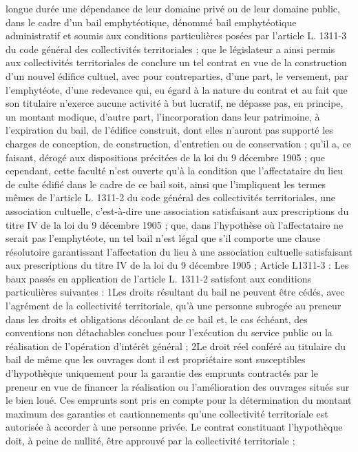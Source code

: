 \documentclass[11pt,a4paper]{report}
\begin{document}
longue durée une dépendance de leur domaine privé ou de leur domaine public, dans le cadre d'un bail
emphytéotique, dénommé bail emphytéotique administratif et soumis aux conditions particulières posées par
l'article L. 1311-3 du code général des collectivités territoriales ; que le législateur a ainsi permis aux
collectivités territoriales de conclure un tel contrat en vue de la construction d'un nouvel édifice cultuel, avec
pour contreparties, d'une part, le versement, par l'emphytéote, d'une redevance qui, eu égard à la nature du
contrat et au fait que son titulaire n'exerce aucune activité à but lucratif, ne dépasse pas, en principe, un
montant modique, d'autre part, l'incorporation dans leur patrimoine, à l'expiration du bail, de l'édifice construit,
dont elles n'auront pas supporté les charges de conception, de construction, d'entretien ou de conservation ;
qu'il a, ce faisant, dérogé aux dispositions précitées de la loi du 9 décembre 1905 ; que cependant, cette faculté
n'est ouverte qu'à la condition que l'affectataire du lieu de culte édifié dans le cadre de ce bail soit, ainsi que
l'impliquent les termes mêmes de l'article L. 1311-2 du code général des collectivités territoriales, une
association cultuelle, c'est-à-dire une association satisfaisant aux prescriptions du titre IV de la loi du 9
décembre 1905 ; que, dans l'hypothèse où l'affectataire ne serait pas l'emphytéote, un tel bail n'est légal que s'il
comporte une clause résolutoire garantissant l'affectation du lieu à une association cultuelle satisfaisant aux
prescriptions du titre IV de la loi du 9 décembre 1905 ;
Article L1311-3 : Les baux passés en application de l'article L. 1311-2 satisfont aux conditions particulières
suivantes :
1\degre  Les droits résultant du bail ne peuvent être cédés, avec l'agrément de la collectivité territoriale, qu'à une
personne subrogée au preneur dans les droits et obligations découlant de ce bail et, le cas échéant, des
conventions non détachables conclues pour l'exécution du service public ou la réalisation de l'opération d'intérêt
général ;
2\degre  Le droit réel conféré au titulaire du bail de même que les ouvrages dont il est propriétaire sont susceptibles
d'hypothèque uniquement pour la garantie des emprunts contractés par le preneur en vue de financer la
réalisation ou l'amélioration des ouvrages situés sur le bien loué.
Ces emprunts sont pris en compte pour la détermination du montant maximum des garanties et cautionnements
qu'une collectivité territoriale est autorisée à accorder à une personne privée.
Le contrat constituant l'hypothèque doit, à peine de nullité, être approuvé par la collectivité territoriale ;
\end{document}
